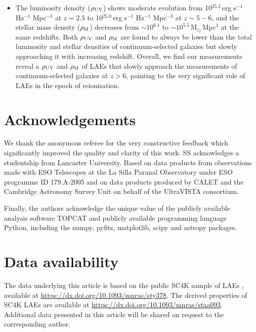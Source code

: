 \documentclass[a4paper,fleqn,usenatbib]{mnras}
\begin{document}
\begin{itemize}
\item The luminosity density ($\rho_{\rm UV}$) shows moderate evolution from 10$^{25.2}$\,erg s$^{-1}$ Hz$^{-1}$ Mpc$^{-3}$ at $z=2.5$ to 10$^{25.0}$\,erg s$^{-1}$ Hz$^{-1}$ Mpc$^{-3}$ at $z\sim5-6$, and the stellar mass density ($\rho_{\rm M}$) decreases from $\sim10^{6.1}$ to $\sim10^{5.5}$\,M$_\odot$\,Mpc$^3$ at the same redshifts. Both $\rho_{\rm UV}$ and $\rho_{\rm M}$ are found to always be lower than the total luminosity and stellar densities of continuum-selected galaxies but slowly approaching it with increasing redshift. Overall, we find our measurements reveal a $\rho_{\rm UV}$ and $\rho_{\rm M}$ of LAEs that slowly approach the measurements of continuum-selected galaxies at $z>6$, pointing to the very significant role of LAEs in the epoch of reionisation.
\end{itemize}


\section*{Acknowledgements}

We thank the anonymous referee for the very constructive feedback which significantly improved the quality and clarity of this work. SS acknowledges a studentship from Lancaster University. Based on data products from observations made with ESO Telescopes at the La Silla Paranal Observatory under ESO programme ID 179.A-2005 and on data products produced by CALET and the Cambridge Astronomy Survey Unit on behalf of the UltraVISTA consortium.

Finally, the authors acknowledge the unique value of the publicly available analysis software {\sc TOPCAT} \citep{Taylor2005} and publicly available programming language {\sc Python}, including the {\sc numpy}, {\sc pyfits}, {\sc matplotlib}, {\sc scipy} and {\sc astropy} \citep{Astropy2013} packages.

\section*{Data availability}

The data underlying this article is based on the public SC4K sample of LAEs \citep[][]{Sobral2018}, available at \href{https://dx.doi.org/10.1093/mnras/sty378}{https://dx.doi.org/10.1093/mnras/sty378}. The derived properties of SC4K LAEs \citep{Santos2020} are available at \href{https://dx.doi.org/10.1093/mnras/staa093}{https://dx.doi.org/10.1093/mnras/staa093}. Additional data presented in this article will be shared on request to the corresponding author.






\appendix



\bsp	%
\label{lastpage}
\end{document}
